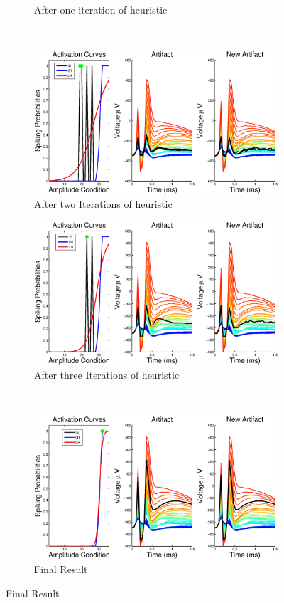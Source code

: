 \documentclass[12pt,letterpaper,fleqn]{article}
\begin{document}
\begin{figure}[ht!]
\begin{subfigure}[b]{0.5\textwidth}
                \caption{After one iteration of heuristic}
        \end{subfigure}~
         \begin{subfigure}[b]{0.5\textwidth}
                \includegraphics[width=\textwidth]{i3.eps}
                \caption{After two Iterations of heuristic}
        \end{subfigure}
        
        
        \begin{subfigure}[b]{0.5\textwidth}
                \includegraphics[width=\textwidth]{i4.eps}
                \caption{After three Iterations of heuristic}
        \end{subfigure}~
         \begin{subfigure}[b]{0.5\textwidth}
                \includegraphics[width=\textwidth]{i6.eps}
                \caption{Final Result}


\end{subfigure}
\end{figure}
\end{document}
